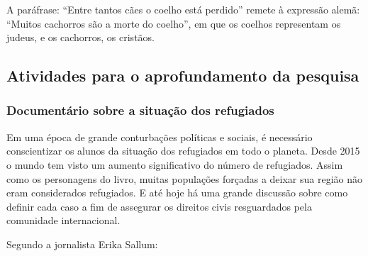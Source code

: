\documentclass[12pt]{extarticle}
\begin{document}
A paráfrase: ``Entre tantos cães o coelho está perdido'' remete à
expressão alemã: ``Muitos cachorros são a morte do coelho'', em que os
coelhos representam os judeus, e os cachorros, os cristãos.

\subsection{Atividades para o aprofundamento da pesquisa}

\subsubsection{Documentário sobre a situação dos refugiados}

Em uma época de grande conturbações políticas e sociais, 
é necessário conscientizar os alunos da situação dos refugiados 
em todo o planeta. Desde 2015 o mundo tem visto um aumento 
significativo do número de refugiados. Assim como os personagens 
do livro, muitas populações forçadas a deixar sua região não eram considerados 
refugiados. E até hoje há uma grande discussão sobre como definir
cada caso a fim de assegurar os direitos civis resguardados pela 
comunidade internacional. 

Segundo a jornalista Erika Sallum:
\end{document}
